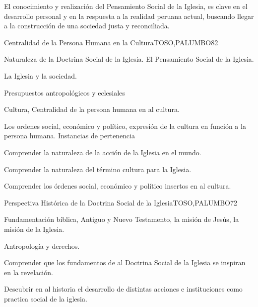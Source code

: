 \begin{syllabus}


\begin{justification}
El conocimiento y realización del Pensamiento Social de la Iglesia, es clave en el desarrollo personal 
y en la respuesta a la realidad peruana actual, buscando llegar a la construcción de una 
sociedad justa y reconciliada.
\end{justification}

\begin{goals}
\item \OutcomeFH
\end{goals}

\begin{outcomes}
\end{outcomes}

\begin{unit}{Centralidad de la Persona Humana en la Cultura}{TOSO,PALUMBO}{8}{2}
\begin{topics}
	\item Naturaleza de la Doctrina Social de la Iglesia.  El Pensamiento Social de la Iglesia.
	\item La Iglesia y la sociedad.
	\item Presupuestos antropológicos y eclesiales
	\item Cultura, Centralidad de la persona humana en al cultura.
	\item Los ordenes social, económico y político, expresión de la cultura en función a la persona humana.  Instancias de pertenencia
\end{topics}
\begin{learningoutcomes}
	\item Comprender la naturaleza de la acción de la Iglesia en el mundo.
	\item Comprender la naturaleza del término cultura para la Iglesia.
	\item Comprender los órdenes social, económico y político insertos en al cultura.
\end{learningoutcomes}
\end{unit}

\begin{unit}{Perspectiva Histórica de la Doctrina Social de la Iglesia}{TOSO,PALUMBO}{7}{2}
\begin{topics}
	\item Fundamentación bíblica, Antiguo y Nuevo Testamento, la misión de Jesús, la misión de la Iglesia.
	\item Antropología y derechos.
\end{topics}
\begin{learningoutcomes}
	\item Comprender que los fundamentos de al Doctrina Social de la Iglesia se inspiran en la revelación.
	\item Descubrir en al historia el desarrollo de distintas acciones e instituciones como practica social de la iglesia.
\end{learningoutcomes}
\end{unit}


\end{syllabus}
